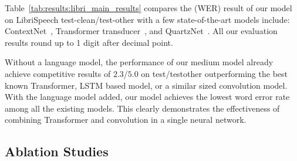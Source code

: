 Table~\ref{tab:results:libri_main_results} compares the (WER) result of our model on LibriSpeech test-clean/test-other with a few state-of-the-art models include: ContextNet~\cite{han2020contextnet}, Transformer transducer~\cite{zhang2020transformer}, and QuartzNet~\cite{kriman2019quartznet}.
All our evaluation results round up to 1 digit after decimal point.

Without a language model, the performance of our medium model already achieve competitive results of $2.3$/$5.0$ on test/testother outperforming the best known Transformer, LSTM based model, or a similar sized convolution model. With the language model added, our model achieves the lowest word error rate among all the existing models. This clearly demonstrates the effectiveness of combining Transformer and convolution in a single neural network. 



\subsection{Ablation Studies}

